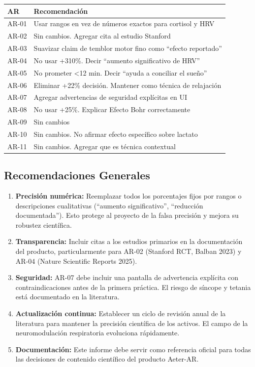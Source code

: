 \documentclass[12pt,a4paper]{article}
\begin{document}
\vspace{0.2cm}
\begin{tabularx}{\textwidth}{lX}
\toprule
\textbf{AR} & \textbf{Recomendación} \\
\midrule
AR-01 & Usar rangos en vez de números exactos para cortisol y HRV \\
AR-02 & Sin cambios. Agregar cita al estudio Stanford \\
AR-03 & Suavizar claim de temblor motor fino como ``efecto reportado'' \\
AR-04 & No usar +310\%. Decir ``aumento significativo de HRV'' \\
AR-05 & No prometer <12 min. Decir ``ayuda a conciliar el sueño'' \\
AR-06 & Eliminar +22\% decisión. Mantener como técnica de relajación \\
AR-07 & Agregar advertencias de seguridad explícitas en UI \\
AR-08 & No usar +25\%. Explicar Efecto Bohr correctamente \\
AR-09 & Sin cambios \\
AR-10 & Sin cambios. No afirmar efecto específico sobre lactato \\
AR-11 & Sin cambios. Agregar que es técnica contextual \\
\bottomrule
\end{tabularx}

\subsection{Recomendaciones Generales}

\begin{enumerate}[itemsep=2pt]
    \item \textbf{Precisión numérica:} Reemplazar todos los porcentajes fijos
          por rangos o descripciones cualitativas (``aumento significativo'',
          ``reducción documentada''). Esto protege al proyecto de la falsa
          precisión y mejora su robustez científica.
    \item \textbf{Transparencia:} Incluir citas a los estudios primarios en la
          documentación del producto, particularmente para AR-02 (Stanford RCT,
          Balban 2023) y AR-04 (Nature Scientific Reports 2025).
    \item \textbf{Seguridad:} AR-07 debe incluir una pantalla de advertencia
          explícita con contraindicaciones antes de la primera práctica. El
          riesgo de síncope y tetania está documentado en la literatura.
    \item \textbf{Actualización continua:} Establecer un ciclo de revisión
          anual de la literatura para mantener la precisión científica de los
          activos. El campo de la neuromodulación respiratoria evoluciona
          rápidamente.
    \item \textbf{Documentación:} Este informe debe servir como referencia
          oficial para todas las decisiones de contenido científico del
          producto Aeter-AR.
\end{enumerate}
\end{document}
